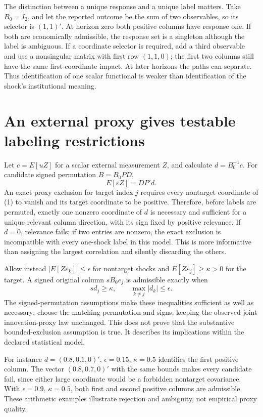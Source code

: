 \documentclass[11pt,a4paper]{article}
\begin{document}
The distinction between a unique response and a unique label matters. Take $B_0=I_2$, and let the reported outcome be the sum of two observables, so its selector is $(1,1)'$. At horizon zero both positive columns have response one. If both are economically admissible, the response set is a singleton although the label is ambiguous. If a coordinate selector is required, add a third observable and use a nonsingular matrix with first row $(1,1,0)$; the first two columns still have the same first-coordinate impact. At later horizons the paths can separate. Thus identification of one scalar functional is weaker than identification of the shock's institutional meaning.

\section{An external proxy gives testable labeling restrictions}
Let $c=E[uZ]$ for a scalar external measurement $Z$, and calculate
$d=B_0^{-1}c$. For candidate signed permutation $B=B_0PD$,
\[
 E[\varepsilon Z]=DP'd. \tag{1}
\]
An exact proxy exclusion for target index $j$ requires every nontarget coordinate of (1) to vanish and its target coordinate to be positive. Therefore, before labels are permuted, exactly one nonzero coordinate of $d$ is necessary and sufficient for a unique relevant column direction, with its sign fixed by positive relevance. If $d=0$, relevance fails; if two entries are nonzero, the exact exclusion is incompatible with every one-shock label in this model. This is more informative than assigning the largest correlation and silently discarding the others.

Allow instead $|E[Z\varepsilon_k]|\le\epsilon$ for nontarget shocks and $E[Z\varepsilon_j]\ge\kappa>0$ for the target. A signed original column $sB_0e_j$ is admissible exactly when
\[
 sd_j\ge\kappa,\qquad \max_{k\ne j}|d_k|\le\epsilon. \tag{2}
\]
The signed-permutation assumptions make these inequalities sufficient as well as necessary: choose the matching permutation and signs, keeping the observed joint innovation-proxy law unchanged. This does not prove that the substantive bounded-exclusion assumption is true. It describes its implications within the declared statistical model.

For instance $d=(0.8,0.1,0)'$, $\epsilon=0.15$, $\kappa=0.5$ identifies the first positive column. The vector $(0.8,0.7,0)'$ with the same bounds makes every candidate fail, since either large coordinate would be a forbidden nontarget covariance. With $\epsilon=0.9$, $\kappa=0.5$, both first and second positive columns are admissible. These arithmetic examples illustrate rejection and ambiguity, not empirical proxy quality.
\end{document}
